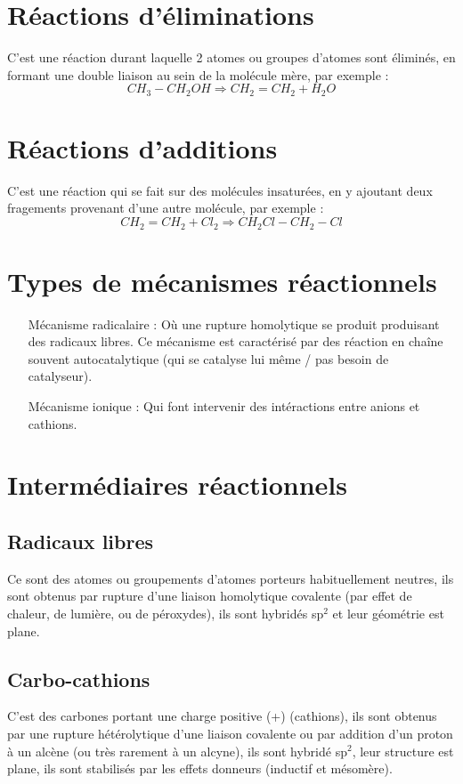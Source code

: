 \documentclass[a4paper, oneside]{book}
\begin{document}
\section{Réactions d'éliminations}
C'est une réaction durant laquelle 2 atomes ou groupes d'atomes sont éliminés, en formant une double liaison au sein de la molécule mère, par exemple :
\[
    CH_3-CH_2OH \Longrightarrow CH_2=CH_2 + H_2O 
\]
\section{Réactions d'additions}
C'est une réaction qui se fait sur des molécules insaturées, en y ajoutant deux fragements provenant d'une autre molécule, par exemple : 
\[
    CH_2=CH_2 + Cl_2 \Longrightarrow CH_2Cl-CH_2-Cl
\]
\section{Types de mécanismes réactionnels}
\begin{itemize}
    \item[Mécanisme radicalaire : ] Où une rupture homolytique se produit produisant des radicaux libres. Ce mécanisme est caractérisé par des réaction en chaîne souvent autocatalytique (qui se catalyse lui même / pas besoin de catalyseur).
    \item[Mécanisme ionique : ] Qui font intervenir des intéractions entre anions et cathions.
\end{itemize}
\section{Intermédiaires réactionnels}
\subsection{Radicaux libres}
Ce sont des atomes ou groupements d'atomes porteurs habituellement neutres, ils sont obtenus par rupture d'une liaison homolytique covalente (par effet de chaleur, de lumière, ou de péroxydes), ils sont hybridés sp$^2$ et leur géométrie est plane.
\subsection{Carbo-cathions}
C'est des carbones portant une charge positive (+) (cathions), ils sont obtenus par une rupture hétérolytique d'une liaison covalente ou par addition d'un proton à un alcène (ou très rarement à un alcyne), ils sont hybridé sp$^2$, leur structure est plane, ils sont stabilisés par les effets donneurs (inductif et mésomère).
\end{document}
